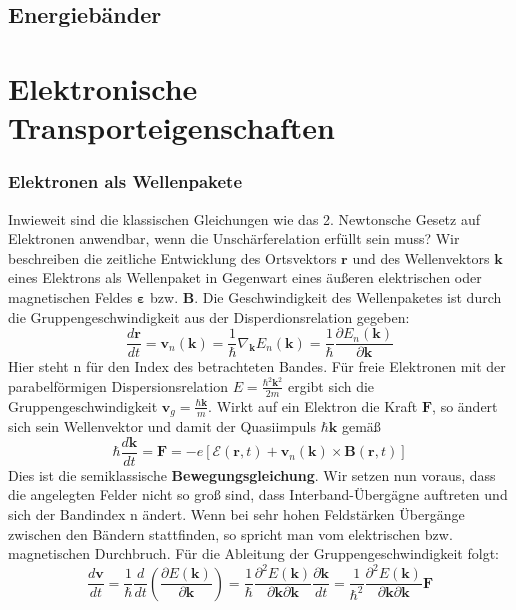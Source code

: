 \documentclass[11pt]{article}
\begin{document}
\subsection{Energiebänder}
\section{Elektronische Transporteigenschaften}
\subsubsection{Elektronen als Wellenpakete}
Inwieweit sind die klassischen Gleichungen wie das 2. Newtonsche Gesetz auf
Elektronen anwendbar, wenn die Unschärferelation erfüllt sein muss?
Wir beschreiben die zeitliche Entwicklung des Ortsvektors $\bm{r}$ und des
Wellenvektors $\bm{k}$ eines Elektrons als Wellenpaket in Gegenwart eines
äußeren elektrischen oder magnetischen Feldes $\bm{\varepsilon}$ bzw.
$\bm{B}$. Die Geschwindigkeit des Wellenpaketes ist durch die
Gruppengeschwindigkeit aus der Disperdionsrelation gegeben:
\begin{equation}
  \frac{d\bm{r}}{dt}=\bm{v}_n(\bm{k})=\frac{1}{\hbar}\nabla_{\bm{k}}E_n(\bm{k})
  =\frac{1}{\hbar}\frac{\partial E_n(\bm{k})}{\partial\bm{k}}
\end{equation}
Hier steht n für den Index des betrachteten Bandes. Für freie Elektronen mit der
parabelförmigen Dispersionsrelation $E=\frac{\hbar^2\bm{k}^2}{2m}$ ergibt sich
die Gruppengeschwindigkeit $\bm{v}_g=\frac{\hbar\bm{k}}{m}$. Wirkt auf ein
Elektron die Kraft $\bm{F}$, so ändert sich sein Wellenvektor und damit der
Quasiimpuls $\hbar\bm{k}$ gemäß
\begin{equation}
  \hbar\frac{d\bm{k}}{dt}=\bm{F}=-e\left[\mathcal{E}(\bm{r},t)+\bm{v}_n(\bm{k})
  \times\bm{B}(\bm{r},t)\right]
\end{equation}
Dies ist die semiklassische \textbf{Bewegungsgleichung}. Wir setzen nun voraus,
dass die angelegten Felder nicht so groß sind, dass Interband-Übergägne
auftreten und sich der Bandindex n ändert. Wenn bei sehr hohen Feldstärken
Übergänge zwischen den Bändern stattfinden, so spricht man vom elektrischen
bzw. magnetischen Durchbruch. Für die Ableitung der Gruppengeschwindigkeit
folgt:
\begin{equation}
  \frac{d\bm{v}}{dt}=\frac{1}{\hbar}\frac{d}{dt}\left(\frac{\partial E(\bm{k})}
  {\partial\bm{k}}\right)=\frac{1}{\hbar}\frac{\partial^2E(\bm{k})}
  {\partial\bm{k}\partial\bm{k}}\frac{\partial\bm{k}}{dt}=
  \frac{1}{\hbar^2}\frac{\partial^2E(\bm{k})}
  {\partial\bm{k}\partial\bm{k}}\bm{F}
\end{equation}
\end{document}
